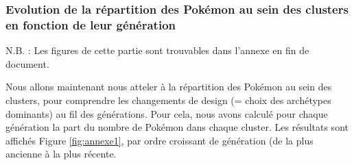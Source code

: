 \documentclass[a4paper,12pt]{article}
\begin{document}
\subsubsection{Evolution de la répartition des Pokémon au sein des clusters en fonction de leur génération}

N.B. : Les figures de cette partie sont trouvables dans l'annexe en fin de
document.

Nous allons maintenant nous atteler à la répartition des Pokémon au sein des
clusters, pour comprendre les changements de design (= choix des archétypes
dominants) au fil des générations. Pour cela, nous avons calculé pour chaque
génération la part du nombre de Pokémon dans chaque cluster. Les résultats sont
affichés Figure \ref{fig:annexe1}, par ordre croissant de génération (de la plus
ancienne à la plus récente.
\end{document}

